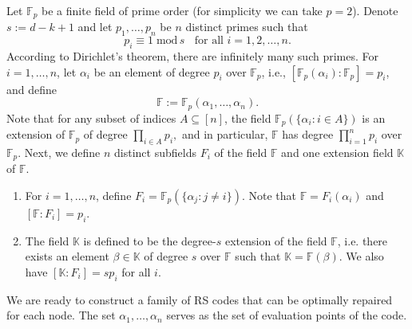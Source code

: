 \documentclass[11pt,onecolumn]{IEEEtran}
\begin{document}
Let $\mathbb{F}_p$ be a finite field of prime order (for simplicity we can take $p=2$). Denote  $s:=d-k+1$ and let $p_1,\dots,p_n$ be $n$ distinct primes such that
\begin{equation}\label{eq:pms}
p_i\equiv 1 \;\text{mod}\, s \;\;\text{~for all~} i=1,2,\dots,n.
\end{equation}
According to Dirichlet's theorem, there are infinitely many such primes. For $i=1,\dots,n$, let $\alpha_i$ be an element of 
degree $p_i$ over $\mathbb{F}_p$, i.e., $[\mathbb{F}_p(\alpha_i):\mathbb{F}_p]=p_i$, and define 
\begin{equation}\label{eq:defF}
\mathbb{F}:=\mathbb{F}_p(\alpha_1,\dots,\alpha_n).
\end{equation}
Note that for any subset of indices $A\subseteq [n]$, the field $\mathbb{F}_p(\{\alpha_i:i\in A\})$ is an extension of $\mathbb{F}_p$
of degree $\prod_{i\in A}p_i,$ and in particular, $\mathbb{F}$ has degree $\prod_{i=1}^np_i$ over $\mathbb{F}_p$. 
Next, we define $n$ distinct subfields  $F_i$ of the field $\mathbb{F}$ and one extension field $\mathbb{K}$ of $\mathbb{F}$. 
    \begin{enumerate}
\item
For $i=1,\dots,n$, define $F_i=\mathbb{F}_p(\{\alpha_j:j\neq i\})$. Note that $\mathbb{F}= F_i(\alpha_i)$ and $[\mathbb{F} : F_i]=p_i$.  
\item The field $\mathbb{K}$ is defined to be the degree-$s$ extension of the field $\mathbb{F}$, i.e. there exists an element $\beta\in \mathbb{K}$ of degree $s$ over $\mathbb{F}$ such that $\mathbb{K}=\mathbb{F}(\beta).$
We also have $[\mathbb{K}: F_i]=s p_i$ for all $i$.
    \end{enumerate}

We are ready to construct a family of RS codes that can be optimally repaired for each node. The set $\alpha_1,\dots,\alpha_n$
serves as the set of evaluation points of the code.
\end{document}

